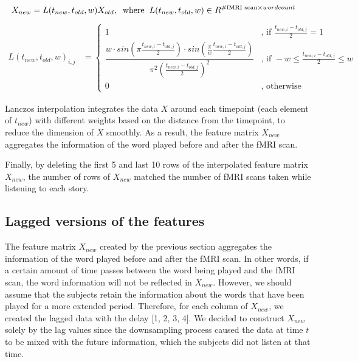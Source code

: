 \documentclass[12pt,letterpaper]{article}
\begin{document}
\begin{align*}
X_{new} &= L(t_{new}, t_{old}, w) X_{old}, \hspace{2mm}\text{where}\hspace{2mm} L(t_{new}, t_{old}, w) \in R^{\#\text{fMRI scan} \times wordcount}
\end{align*}
\begin{align*}
L(t_{new}, t_{old}, w)_{i, j} &= 
\begin{cases}
    1 & \text{, if } \frac{t_{new, i} - t_{old, j}}{2} = 1 \\
    \dfrac{w \cdot sin(\pi\frac{t_{new, i} - t_{old, j}}{2}) \cdot sin(\frac{\pi}{w} \frac{t_{new, i} - t_{old, j}}{2})}{\pi^2 (\frac{t_{new, i} - t_{old, j}}{2})^2} & \text{, if } -w \leq \frac{t_{new, i} - t_{old, j}}{2} \leq w \\
    0 & \text{, otherwise}
\end{cases}
\end{align*}

Lanczos interpolation integrates the data $X$ around each timepoint (each element of $t_{new}$) with different weights based on the distance from the timepoint, to reduce the dimension of $X$ smoothly. As a result, the feature matrix $X_{new}$ aggregates the information of the word played before and after the fMRI scan.

Finally, by deleting the first 5 and last 10 rows of the interpolated feature matrix $X_{new}$, the number of rows of $X_{new}$ matched the number of fMRI scans taken while listening to each story.

\subsection{Lagged versions of the features}
The feature matrix $X_{new}$ created by the previous section aggregates the information of the word played before and after the fMRI scan. In other words, if a certain amount of time passes between the word being played and the fMRI scan, the word information will not be reflected in $X_{new}$. However, we should assume that the subjects retain the information about the words that have been played for a more extended period. Therefore, for each column of $X_{new}$, we created the lagged data with the delay [1, 2, 3, 4]. We decided to construct $X_{new}$ solely by the lag values since the downsampling process caused the data at time $t$ to be mixed with the future information, which the subjects did not listen at that time.
\end{document}
